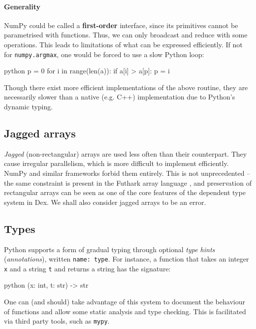\paragraph{Generality} NumPy could be called a \textbf{first-order} interface, since its primitives cannot be parametrised with functions. Thus, we can only broadcast and reduce with some operations. This leads to limitations of what can be expressed efficiently. If not for \texttt{numpy.argmax}, one would be forced to use a slow Python loop:
\begin{center}
\begin{cminted}{python}
p = 0
for i in range(len(a)): 
    if a[i] > a[p]: p = i
\end{cminted}
\end{center}
Though there exist more efficient implementations of the above routine, they are necessarily slower than a native (e.g. C++) implementation due to Python's dynamic typing.

\subsection{Jagged arrays}

\textit{Jagged} (non-rectangular) arrays are used less often than their counterpart. 
They cause irregular parallelism, which is more difficult to implement efficiently. 
NumPy and similar frameworks forbid them entirely. This is not unprecedented -- the same constraint is present in the Futhark array language \cite{henriksen2017futhark}, and preservation of rectangular arrays can be seen as one of the core features of the dependent type system in Dex. We shall also consider jagged arrays to be an error.

\subsection{Types}

Python supports a form of gradual typing through optional \textit{type hints} (\textit{annotations}), written \texttt{name: type}. For instance, a function that takes an integer \texttt{x} and a string \texttt{t} and returns a string has the signature:
\begin{center}
\begin{cminted}{python}
(x: int, t: str) -> str
\end{cminted}
\end{center}
One can (and should) take advantage of this system to document the behaviour of functions and allow some static analysis and type checking. This is facilitated via third party tools, such as \texttt{mypy}.

